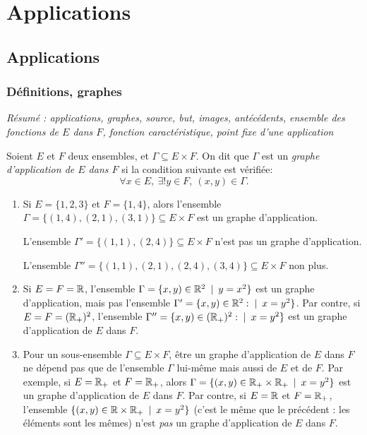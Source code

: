 \chapter{Applications}
\minitoc
\hyperlink{toc}{\retourTOC}




\section{Applications}

\subsection{Définitions, graphes}

\emph{Résumé : applications, graphes, source, but, images, antécédents, ensemble des fonctions de $E$ dans $F$, fonction caractéristique, point fixe d'une application}

\begin{definition}\label{def-graphe}
Soient $E$ et $F$ deux ensembles, et $\Gamma \subseteq E\times F$. On dit que $\Gamma$ est un \emph{graphe d'application de $E$ dans $F$} si la condition suivante est vérifiée:
\[\forall x\in E, \: \exists! y\in F, \: (x,y) \in \Gamma.\]
\end{definition}

\begin{exemple}
\begin{enumerate}
\item Si $E = \{1,2,3\}$ et $F = \{1,4\}$, alors l'ensemble $\Gamma = \{(1,4),(2,1),(3,1)\} \subseteq E\times F$ est un graphe d'application.

L'ensemble $\Gamma' = \{(1,1),(2,4)\} \subseteq E\times F$ n'est pas un graphe d'application.

L'ensemble $\Gamma'' = \{(1,1),(2,1),(2,4),(3,4)\} \subseteq E\times F$ non plus.
\item Si $E = F = \mathbb{R}$, l'ensemble $\Gamma = \{x,y)\in \R^2 \:\mid\: y=x^2\}$ est un graphe d'application, mais pas l'ensemble $\Gamma' = \{x,y)\in \R^2 :\mid\: x=y^2\}$. Par contre, si $E=F=(\mathbb{R}_+)^2$, l'ensemble  $\Gamma'' = \{x,y)\in (\R_+)^2 :\mid\: x=y^2\}$ est un graphe d'application de $E$ dans $F$.
\item Pour un sous-ensemble $\Gamma\subseteq E\times F$, être un graphe d'application de $E$ dans $F$ ne dépend pas que de l'ensemble $\Gamma$ lui-même mais aussi de $E$ et de $F$. Par exemple, si $E=\mathbb{R}_+$ et $F=\mathbb{R}_+$, alors $\Gamma = \{(x,y)\in \R_+\times \R_+ \:\mid\: x=y^2\}$ est un graphe d'application de $E$ dans $F$. Par contre, si $E=\mathbb{R}$ et $F=\mathbb{R}_+$, l'ensemble $\{(x,y)\in \R\times \R_+ \:\mid\: x=y^2\}$ (c'est le même que le précédent : les éléments sont les mêmes) n'est \emph{pas} un graphe d'application de $E$ dans $F$.
\end{enumerate}
\end{exemple}

